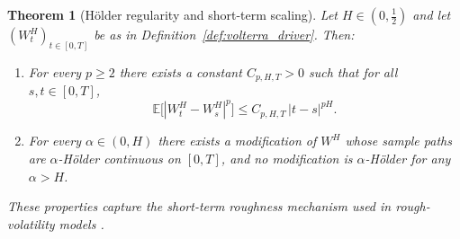 \documentclass[12pt,a4paper]{article}
\theoremstyle{definition}
\theoremstyle{plain}
\newtheorem{theorem}{Theorem}[section]
\theoremstyle{remark}
\theoremstyle{plain}
\begin{document}
\begin{theorem}[H\"older regularity and short-term scaling]
\label{thm:holder_rough_driver}
Let $H\in(0,\tfrac12)$ and let $(W^H_t)_{t\in[0,T]}$ be as in Definition~\ref{def:volterra_driver}. Then:
\begin{enumerate}
    \item For every $p\ge 2$ there exists a constant $C_{p,H,T}>0$ such that for all $s,t\in[0,T]$,
    \[
        \mathbb E\bigl[|W^H_t - W^H_s|^p\bigr]
        \le
        C_{p,H,T}\,|t-s|^{pH}.
    \]
    \item For every $\alpha\in(0,H)$ there exists a modification of $W^H$ whose sample paths are $\alpha$-H\"older continuous on $[0,T]$, and no modification is $\alpha$-H\"older for any $\alpha>H$.
\end{enumerate}
These properties capture the short-term roughness mechanism used in rough-volatility models \cite{GatheralRough,BayerFriz2016}.
\end{theorem}
\end{document}
